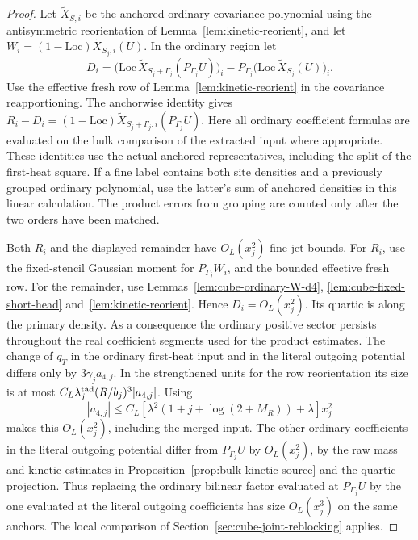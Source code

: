 \documentclass[11pt]{article}
\theoremstyle{definition}
\begin{document}
\begin{proof}
Let \(\widetilde X_{S,i}\) be the anchored ordinary covariance
polynomial using the antisymmetric reorientation of
Lemma~\ref{lem:kinetic-reorient}, and let
\(W_i=(1-\mathrm{Loc})\widetilde X_{S_j,i}(U)\).
In the ordinary region let
\begin{equation}
 D_i=\bigl(\mathrm{Loc}\,\widetilde X_{S_j+\Gamma_j}(P_{\Gamma_j}U)\bigr)_i
       -P_{\Gamma_j}\bigl(\mathrm{Loc}\,\widetilde X_{S_j}(U)\bigr)_i .
\end{equation}
Use the effective fresh row of Lemma~\ref{lem:kinetic-reorient}
in the covariance reapportioning. The anchorwise identity gives
\(R_i-D_i=(1-\mathrm{Loc})\widetilde X_{S_j+\Gamma_j,i}(P_{\Gamma_j}U)\).
Here all ordinary coefficient formulas are evaluated on the bulk
comparison of the extracted input where appropriate. These
identities use the actual anchored representatives, including
the split of the first-heat square. If a fine label contains both
site densities and a previously grouped ordinary polynomial, use
the latter's sum of anchored densities in this linear calculation.
The product errors from grouping are counted only after the two
orders have been matched.

Both \(R_i\) and the displayed remainder have \(O_L(x_j^2)\)
fine jet bounds. For \(R_i\), use the fixed-stencil Gaussian
moment for \(P_{\Gamma_j}W_i\), and the bounded effective
fresh row. For the remainder, use
Lemmas~\ref{lem:cube-ordinary-W-d4}, \ref{lem:cube-fixed-short-head}
and~\ref{lem:kinetic-reorient}. Hence \(D_i=O_L(x_j^2)\).
Its quartic is along the primary density. As a consequence
the ordinary positive sector persists throughout the real
coefficient segments used for the product estimates. The change
of \(q_T\) in the ordinary first-heat input and in the literal
outgoing potential differs only by \(3\gamma_j a_{4,j}\).
In the strengthened units for the row reorientation its size
is at most \(C_L\lambda^{\rm tad}_j(R/b_j)^3|a_{4,j}|\).
Using
\begin{equation}
 |a_{4,j}|\le
 C_L[\lambda^2(1+j+\log(2+M_R))+\lambda]x_j^2
\end{equation}
makes this \(O_L(x_j^2)\), including the merged input.
The other ordinary coefficients in the literal outgoing
potential differ from \(P_{\Gamma_j}U\) by \(O_L(x_j^2)\),
by the raw mass and kinetic estimates in
Proposition~\ref{prop:bulk-kinetic-source} and the quartic
projection. Thus replacing the ordinary bilinear factor
evaluated at \(P_{\Gamma_j}U\) by the one evaluated at the
literal outgoing coefficients has size \(O_L(x_j^3)\)
on the same anchors. The local comparison of
Section~\ref{sec:cube-joint-reblocking} applies.


\end{proof}
\end{document}
